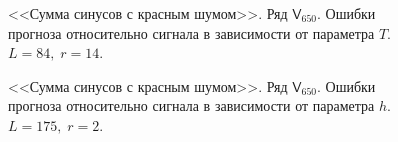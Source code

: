 \documentclass[specialist,
               substylefile = spbu.rtx,
               subf,href,colorlinks=true, 12p]{disser}
\begin{document}
\begin{figure}[H]
	\captionsetup{justification=centering}
	\caption{<<Сумма синусов с красным шумом>>. Ряд $\mathsf{V}_{650}$. Ошибки прогноза относительно сигнала в зависимости от параметра $T$. $L = 84, \; r = 14$.}
\end{figure}

\begin{figure}[H]
	\captionsetup{justification=centering}
	\caption{<<Сумма синусов с красным шумом>>. Ряд $\mathsf{V}_{650}$. Ошибки прогноза относительно сигнала в зависимости от параметра $h$. $L = 175, \; r = 2$.}
	\label{sigserr_r2.h}
\end{figure}
\end{document}
